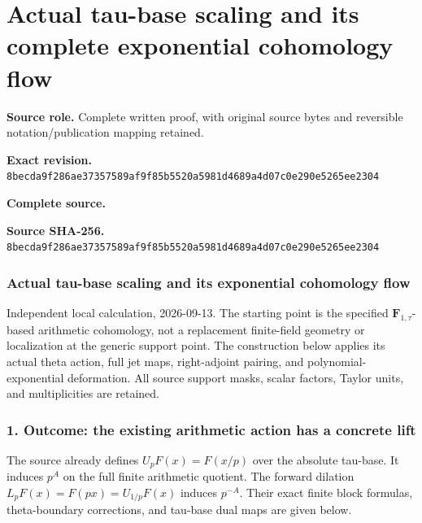 \begingroup

\section{Actual tau-base scaling and its complete exponential cohomology flow}


\begingroup
\sloppy
\small

\noindent\textbf{Source role.} Complete written proof, with original source bytes and reversible notation/publication mapping retained.\par
\noindent\textbf{Exact revision.} \nolinkurl{8becda9f286ae37357589af9f85b5520a5981d4689a4d07c0e290e5265ee2304}\par
\noindent\textbf{Complete source.} \par
\noindent\textbf{Source SHA-256.} \nolinkurl{8becda9f286ae37357589af9f85b5520a5981d4689a4d07c0e290e5265ee2304}\par\medskip
\subsubsection{Actual tau-base scaling and its exponential cohomology flow}\label{endpoint-f1_scaling--actual-tau-base-scaling-and-its-exponential-cohomology-flow}

Independent local calculation, 2026-09-13. The starting point is the specified \(\mathbf F_{1,\tau}\)-based arithmetic cohomology, not a replacement finite-field geometry or localization at the generic support point. The construction below applies its actual theta action, full jet maps, right-adjoint pairing, and polynomial-exponential deformation. All source support masks, scalar factors, Taylor units, and multiplicities are retained.

\subsubsection{1. Outcome: the existing arithmetic action has a concrete lift}\label{endpoint-f1_scaling--outcome-the-existing-arithmetic-action-has-a-concrete-lift}

The source already defines \(U_p F(x)=F(x/p)\) over the absolute tau-base. It induces \(p^A\) on the full finite arithmetic quotient. The forward dilation \(L_p F(x)=F(px)=U_{1/p}F(x)\) induces \(p^{-A}\). Their exact finite block formulas, theta-boundary corrections, and tau-base dual maps are given below.

